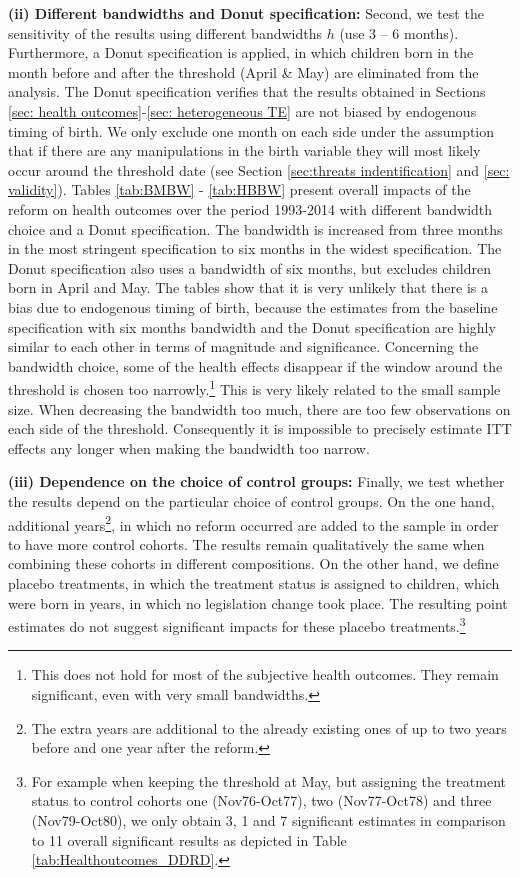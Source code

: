 \documentclass[a4paper ]{article}
\begin{document}
\bigskip
\textbf{(ii) Different bandwidths and Donut specification:} Second, we test the sensitivity of the results using different bandwidths $h$ (use 3 – 6 months). Furthermore, a Donut specification is applied, in which children born in the month before and after the threshold (April \& May) are eliminated from the analysis. The Donut specification verifies that the results obtained in Sections \ref{sec: health outcomes}-\ref{sec: heterogeneous TE} are not biased by endogenous timing of birth. We only exclude one month on each side under the assumption that if there are any manipulations in the birth variable they will most likely occur around the threshold date (see Section \ref{sec:threats indentification} and \ref{sec: validity}). Tables \ref{tab:BMBW} - \ref{tab:HBBW} present overall impacts of the reform on health outcomes over the period 1993-2014 with different bandwidth choice and a Donut specification. The bandwidth is increased from three months in the most stringent specification to six months in the widest specification. The Donut specification also uses a bandwidth of six months, but excludes children born in April and May. The tables show that it is very unlikely that there is a bias due to endogenous timing of birth, because the estimates from the baseline specification with six months bandwidth and the Donut specification are highly similar to each other in terms of magnitude and significance. Concerning the bandwidth choice, some of the health effects disappear if the window around the threshold is chosen too narrowly.\footnote{This does not hold for most of the subjective health outcomes. They remain significant, even with very small bandwidths.} This is very likely related to the small sample size. When decreasing the bandwidth too much, there are too few observations on each side of the threshold. Consequently it is impossible to precisely estimate ITT effects any longer when making the bandwidth too narrow.

\newpage
\textbf{(iii) Dependence on the choice of control groups:} Finally, we test whether the results depend on the particular choice of control groups. On the one hand, additional years\footnote{The extra years are additional to the already existing ones of up to two years before and one year after the reform.}, in which no reform occurred are added to the sample in order to have more control cohorts. The results remain qualitatively the same when combining these cohorts in different compositions. On the other hand, we define placebo treatments, in which the treatment status is assigned to children, which were born in years, in which no legislation change took place. The resulting point estimates do not suggest significant impacts for these placebo treatments.\footnote{For example when keeping the threshold at May, but assigning the treatment status to control cohorts one (Nov76-Oct77), two (Nov77-Oct78) and three (Nov79-Oct80), we only obtain 3, 1 and 7 significant estimates in comparison to 11 overall significant results as depicted in Table \ref{tab:Healthoutcomes_DDRD}.}\newline
\end{document}
